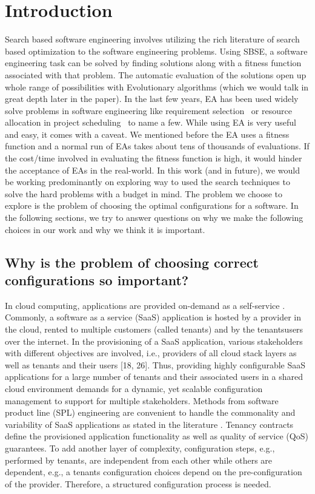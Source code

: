 \documentclass{newsig}
\begin{document}
\section{Introduction}
Search based software engineering involves utilizing the rich literature of search based optimization to the software engineering problems. Using SBSE, a software engineering task can be solved by finding solutions along with a fitness function associated with that problem. 
The automatic evaluation of the solutions open up whole range of possibilities with Evolutionary algorithms (which we would talk in great depth later in the paper). In the last few years, EA has been used widely solve problems in software engineering like requirement selection~\cite{durillo2011study}  or resource allocation in project scheduling~\cite{luna2014software} to name a few. While using EA is very useful and easy, it comes with a caveat. 
We mentioned before the EA uses a fitness function and a normal run of EAs takes about tens of thousands of evaluations. If the cost/time involved in evaluating the fitness function is high, it would hinder the acceptance of EAs in the real-world. 
In this work (and in future), we would be working predominantly on exploring way to used the search techniques to solve the hard problems with a \textquotesingle budget \textquotesingle in mind. The problem we choose to explore is the problem of choosing the optimal configurations for a software. In the following sections, we try to answer questions on why we make the following choices in our work and why we think it is important. 

\subsection*{Why is the problem of choosing correct configurations so important?}\label{section:importance}
In cloud computing, applications are provided on-demand
as a self-service \cite{bennett2000service}. Commonly, a software as a service
(SaaS) application is hosted by a provider in the cloud,
rented to multiple customers (called tenants) and  by the tenants\textquotesingle  users over the internet. In the provisioning
of a SaaS application, various stakeholders with different
objectives are involved, i.e., providers of all cloud stack layers
as well as tenants and their users [18, 26]. Thus, providing
highly configurable SaaS applications for a large number
of tenants and their associated users in a shared cloud environment
demands for a dynamic, yet scalable configuration
management to support for multiple stakeholders. Methods
from software product line (SPL) engineering are convenient
to handle the commonality and variability of SaaS applications
as stated in the literature \cite{reiser2007multi, ruehl2011applying, schroeter2012towards}. 
Tenancy contracts define
the provisioned application functionality as well as quality
of service (QoS) guarantees. To add another layer of complexity, configuration steps, e.g., performed
by tenants, are independent from each other while others
are dependent, e.g., a tenant\textquotesingle s configuration choices depend
on the pre-configuration of the provider. Therefore, a structured configuration process is needed. 
\end{document}
